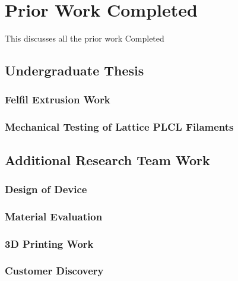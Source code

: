 \section{Prior Work Completed\label{introduction:priorWork}}
This discusses all the prior work Completed

\subsection{Undergraduate Thesis\label{sec:introduction:priorWork:undergradThesis}}

\subsubsection{Felfil Extrusion Work\label{sec:introduction:priorWork:undergradThesis:felfil}}

\subsubsection{Mechanical Testing of Lattice PLCL Filaments\label{sec:introduction:priorWork:undergradThesis:mechTesting}}

\subsection{Additional Research Team Work\label{sec:introduction:priorWork:otherTeamWork}}

\subsubsection{Design of Device\label{sec:introduction:priorWork:otherTeamWork:deviceDesign}}

\subsubsection{Material Evaluation\label{sec:introduction:priorWork:otherTeamWork:materialEval}}

\subsubsection{3D Printing Work\label{sec:introduction:priorWork:otherTeamWork:3dPrinting}}

\subsubsection{Customer Discovery\label{sec:introduction:priorWork:otherTeamWork:customerDiscovery}}
